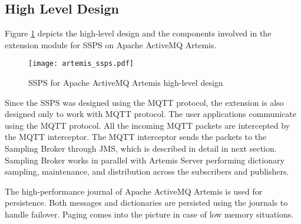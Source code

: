 \subsection{High Level Design}

Figure \ref{figures:artemis_ssps} depicts the high-level design and the components involved in the extension module for SSPS on Apache ActiveMQ Artemis. 

\makeatletter
\setlength{\intextsep}{20pt}
\makeatother

\begin{figure}[h!]
\centering
\texttt{[image: artemis\_ssps.pdf]}
\caption{SSPS for Apache ActiveMQ Artemis high-level design}\label{figures:artemis_ssps}
\end{figure}

Since the SSPS was designed using the MQTT protocol, the extension is also designed only to work with MQTT protocol. The user applications communicate using the MQTT protocol. All the incoming MQTT packets are intercepted by the MQTT interceptor. The MQTT interceptor sends the packets to the Sampling Broker through JMS, which is described in detail in next section. Sampling Broker works in parallel with Artemis Server performing dictionary sampling, maintenance, and distribution across the subscribers and publishers. 

The high-performance journal of Apache ActiveMQ Artemis is used for persistence. Both messages and dictionaries are persisted using the journals to handle failover. Paging comes into the picture in case of low memory situations.
